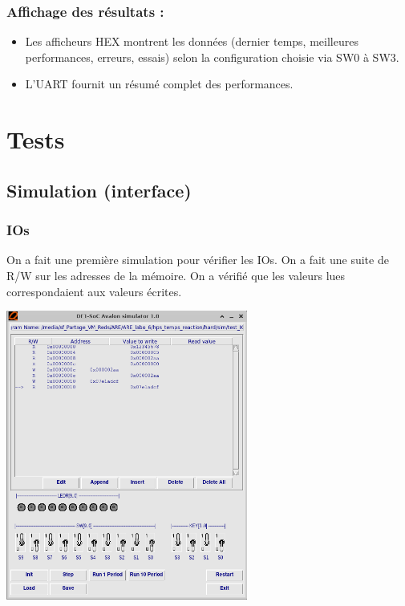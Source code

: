 \documentclass[a4paper,12pt]{article}
\begin{document}
\subsubsection{Affichage des résultats :}

\begin{itemize}
    \item Les afficheurs HEX montrent les données (dernier temps, meilleures performances, erreurs, essais) selon la configuration choisie via SW0 à SW3.
    \item L’UART fournit un résumé complet des performances.
\end{itemize}

\break

\section{Tests}

\subsection{Simulation (interface)}

\subsubsection{IOs}

On a fait une première simulation pour vérifier les IOs. On a fait une suite de R/W sur les adresses de la mémoire. On a vérifié que les valeurs lues correspondaient aux valeurs écrites.

\begin{center}
    \includegraphics[width=300px]{test_IOs.png}
\end{center}
\end{document}
